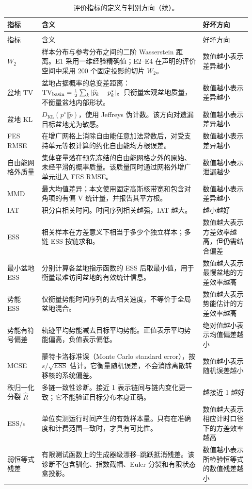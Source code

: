 \documentclass[11pt,a4paper]{article}
\newcommand{\KL}{D_{\mathrm{KL}}}
\newcommand{\ESS}{\mathrm{ESS}}
\begin{document}
\begin{longtable}{L{2.8cm}L{8.4cm}C{2.3cm}}
\caption{评价指标的定义与判别方向。}\label{tab:zh-metrics}\\
\toprule
指标 & 含义 & 好坏方向 \\
\midrule
\endfirsthead
\caption[]{评价指标的定义与判别方向（续）。}\\
\toprule
指标 & 含义 & 好坏方向 \\
\midrule
\endhead
$W_2$ &
样本分布与参考分布之间的二阶 Wasserstein 距离。E1 采用一维经验精确值；E2--E4 在声明的评价空间中采用 200 个固定投影的切片 $W_2$。 &
数值越小表示差异越小 \\
盆地 TV &
盆地占据概率的总变差距离：
$\mathrm{TV}_{\rm basin}=\frac12\sum_k|\widehat p_k-p_k^\star|$。只衡量宏观盆地质量，不衡量盆地内部形状。 &
数值越小表示差异越小 \\
盆地 KL &
$\KL(p^\star\Vert\widetilde p)$，使用 Jeffreys 伪计数。该方向对遗漏目标盆地尤为敏感。 &
数值越小表示差异越小 \\
FES RMSE &
在增广网格上消除自由能任意加法常数后，对受支持单元等权计算的约化自由能均方根误差。 &
数值越小表示差异越小 \\
自由能网格外质量 &
集体变量落在预先冻结的自由能网格之外的原始、未经平滑的概率质量。该质量同时通过网格外增广单元进入 FES RMSE。 &
数值越小表示泄漏越少 \\
MMD &
最大均值差异；本文使用固定高斯核带宽和包含对角项的有偏 V 统计量，并报告其平方根。 &
数值越小表示差异越小 \\
IAT &
积分自相关时间。时间序列相关越强，IAT 越大。 &
越小越好 \\
ESS &
相关样本在方差意义下相当于多少个独立样本；多链 ESS 按链求和。 &
数值越大表示方差效率越高，但仍需结合偏差 \\
最小盆地 ESS &
分别计算各盆地指示函数的 ESS 后取最小值，用于衡量最难访问盆地的有效统计信息。 &
数值越大表示最慢盆地的方差效率越高 \\
势能 ESS &
仅衡量势能时间序列的去相关速度，不等价于全局盆地混合。 &
数值越大表示势能估计的方差效率越高 \\
势能有符号偏差 &
轨迹平均势能减去目标平均势能。正值表示平均势能偏高，负值表示偏低。 &
绝对值越小表示均值偏差越小 \\
MCSE &
蒙特卡洛标准误（Monte Carlo standard error），按 $s/\sqrt{\ESS}$ 估计。它衡量随机误差，不会消除离散转移核的系统偏差。 &
数值越小表示随机误差越小 \\
秩归一化分裂 $\widehat R$ &
多链一致性诊断。接近 1 表示链间与链内变化更一致；它不能验证目标分布本身正确。 &
越接近 1 越好 \\
ESS/s &
单位实测运行时间产生的有效样本量。只有在准确度和计费范围一致时，才具有可比性。 &
数值越大表示相应计时口径下的方差效率越高 \\
弱恒等式残差 &
有限测试函数上的生成器级漂移--跳跃抵消残差。该诊断不包含驯化、指数截帽、Euler 分裂和有限状态盒投影。 &
数值越小表示所检验恒等式的数值残差越小 \\
\bottomrule
\end{longtable}
\end{document}
